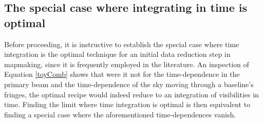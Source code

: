 \documentclass[twocolumn,apj,numberedappendix]{emulateapj}
\begin{document}
\subsection{The special case where integrating in time is optimal}

Before proceeding, it is instructive to establish the special case where time
integration is the optimal technique for an initial data reduction step in mapmaking, since it is frequently employed in the
literature.  An inspection of Equation \eqref{toyComb} shows that were it not
for the time-dependence in the primary beam and the time-dependence of the sky
moving through a baseline's fringes, the optimal recipe would indeed reduce to
an integration of visibilities in time.  Finding the limit where time
integration is optimal is then equivalent to finding a special case where the
aforementioned time-dependences vanish.
\end{document}
